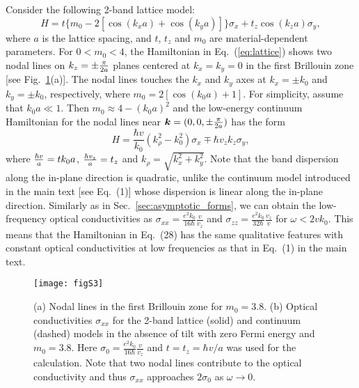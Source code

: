 \documentclass[aps,twocolumn,floatfix]{revtex4-1}
\begin{document}
Consider the following 2-band lattice model:
\begin{equation}
\label{eq:lattice}
H=t\{m_0-2[\cos(k_x a)+\cos(k_y a)]\}\sigma_x + t_z \cos(k_z a) \sigma_y,
\end{equation}
where $a$ is the lattice spacing, and $t$, $t_z$ and $m_0$ are material-dependent parameters. For $0<m_0<4$, the Hamiltonian in Eq.~(\ref{eq:lattice}) shows two nodal lines on $k_z=\pm {\pi\over 2a}$ planes centered at $k_x=k_y=0$ in the first Brillouin zone [see Fig.~\ref{fig:model_comparison_lattice}(a)]. The nodal lines touches the $k_x$ and $k_y$ axes at $k_x=\pm k_0$ and $k_y=\pm k_0$, respectively, 
where $m_0=2[\cos(k_0 a)+1]$. For simplicity, assume that $k_0 a\ll 1$. Then $m_0\approx 4-(k_0 a)^2$ and the low-energy continuum Hamiltonian for the nodal lines near $\bm{k}=(0,0,\pm {\pi\over 2a})$ has the form
\begin{equation}
\label{eq:2band_quadratic}
H=\frac{\hbar v}{k_0}\left(k_\rho^2-k_0^2\right)\sigma_x \mp \hbar v_zk_z\sigma_y,
\end{equation}
where ${\hbar v\over a}=t k_0 a$, ${\hbar v_z\over a}=t_z$ and $k_\rho=\sqrt{k_x^2+k_y^2}$.
Note that the band dispersion along the in-plane direction is quadratic, unlike the continuum model introduced in the main text [see Eq.~(1)] whose dispersion is linear along the in-plane direction. Similarly as in Sec.~\ref{sec:asymptotic_forms}, we can obtain the low-frequency optical conductivities as $\sigma_{xx}=\frac{e^2 k_0}{16\hbar}\frac{v}{v_z}$ and $\sigma_{zz}=\frac{e^2 k_0}{32 \hbar}\frac{v_z}{v}$ for $\omega<2v k_0$. 
This means that the Hamiltonian in Eq.~(28) has the same qualitative features with constant optical conductivities at low frequencies as that in Eq.~(1) in the main text.
\begin{figure}[!htb]
\texttt{[image: figS3]}
\caption{
(a) Nodal lines in the first Brillouin zone for $m_0=3.8$. (b) Optical conductivities $\sigma_{xx}$ for the 2-band lattice (solid) and continuum (dashed) models in the absence of tilt with zero Fermi energy and $m_0=3.8$.  Here $\sigma_0=\frac{e^2 k_0}{16\hbar}\frac{v}{v_z}$ and $t=t_z=\hbar v/a$ was used for the calculation. Note that two nodal lines contribute to the optical conductivity and thus $\sigma_{xx}$ approaches $2\sigma_0$ as $\omega\rightarrow 0$.
}
\label{fig:model_comparison_lattice}
\end{figure}
\end{document}
